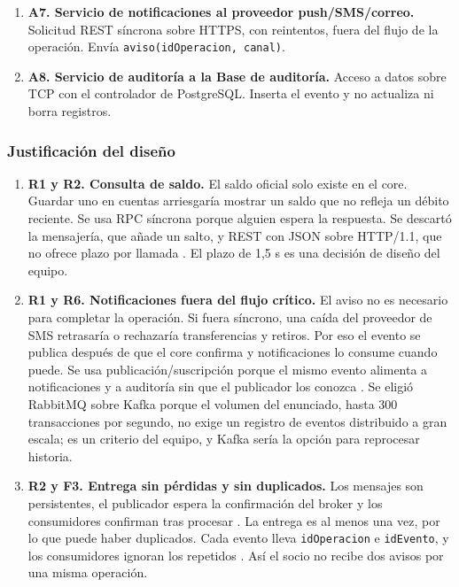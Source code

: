 \documentclass[12pt,a4paper]{article}
\begin{document}
\begin{enumerate}
    \item \textbf{A7. Servicio de notificaciones al proveedor push/SMS/correo.}
    Solicitud REST síncrona sobre HTTPS, con reintentos, fuera del flujo de la operación. Envía \texttt{aviso(idOperacion, canal)}.

    \item \textbf{A8. Servicio de auditoría a la Base de auditoría.}
    Acceso a datos sobre TCP con el controlador de PostgreSQL. Inserta el evento y no actualiza ni borra registros.
\end{enumerate}

\subsubsection{Justificación del diseño}

\begin{enumerate}
    \item \textbf{R1 y R2. Consulta de saldo.}
    El saldo oficial solo existe en el core. Guardar uno en cuentas arriesgaría mostrar un saldo que no refleja un débito reciente. Se usa RPC síncrona porque alguien espera la respuesta. Se descartó la mensajería, que añade un salto, y REST con JSON sobre HTTP/1.1, que no ofrece plazo por llamada \cite{grpcdeadlines}. El plazo de 1,5 s es una decisión de diseño del equipo.

    \item \textbf{R1 y R6. Notificaciones fuera del flujo crítico.}
    El aviso no es necesario para completar la operación. Si fuera síncrono, una caída del proveedor de SMS retrasaría o rechazaría transferencias y retiros. Por eso el evento se publica después de que el core confirma y notificaciones lo consume cuando puede. Se usa publicación/suscripción porque el mismo evento alimenta a notificaciones y a auditoría sin que el publicador los conozca \cite{hohpe2003}. Se eligió RabbitMQ sobre Kafka porque el volumen del enunciado, hasta 300 transacciones por segundo, no exige un registro de eventos distribuido a gran escala; es un criterio del equipo, y Kafka sería la opción para reprocesar historia.

    \item \textbf{R2 y F3. Entrega sin pérdidas y sin duplicados.}
    Los mensajes son persistentes, el publicador espera la confirmación del broker y los consumidores confirman tras procesar \cite{rabbitmqconfirms}. La entrega es al menos una vez, por lo que puede haber duplicados. Cada evento lleva \texttt{idOperacion} e \texttt{idEvento}, y los consumidores ignoran los repetidos \cite{featonbyretries}. Así el socio no recibe dos avisos por una misma operación.


\end{enumerate}
\end{document}
